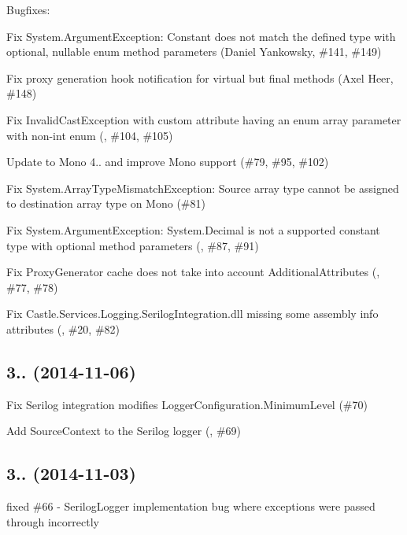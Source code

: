 Bugfixes\+:
\begin{DoxyItemize}
\item Fix \textquotesingle{}System.\+Argument\+Exception\+: Constant does not match the defined type\textquotesingle{} with optional, nullable enum method parameters (Daniel Yankowsky, \#141, \#149)
\item Fix proxy generation hook notification for virtual but final methods (Axel Heer, \#148)
\item Fix Invalid\+Cast\+Exception with custom attribute having an enum array parameter with non-\/int enum (, \#104, \#105)
\item Update to Mono 4.. and improve Mono support (\#79, \#95, \#102)
\item Fix \textquotesingle{}System.\+Array\+Type\+Mismatch\+Exception\+: Source array type cannot be assigned to destination array type\textquotesingle{} on Mono (\#81)
\item Fix \textquotesingle{}System.\+Argument\+Exception\+: System.\+Decimal is not a supported constant type\textquotesingle{} with optional method parameters (, \#87, \#91)
\item Fix Proxy\+Generator cache does not take into account Additional\+Attributes (, \#77, \#78)
\item Fix Castle.\+Services.\+Logging.\+Serilog\+Integration.\+dll missing some assembly info attributes (, \#20, \#82)
\end{DoxyItemize}

\subsection*{3.. (2014-\/11-\/06)}


\begin{DoxyItemize}
\item Fix Serilog integration modifies Logger\+Configuration.\+Minimum\+Level (\#70)
\item Add Source\+Context to the Serilog logger (, \#69)
\end{DoxyItemize}

\subsection*{3.. (2014-\/11-\/03)}


\begin{DoxyItemize}
\item fixed \#66 -\/ Serilog\+Logger implementation bug where exceptions were passed through incorrectly
\end{DoxyItemize}

